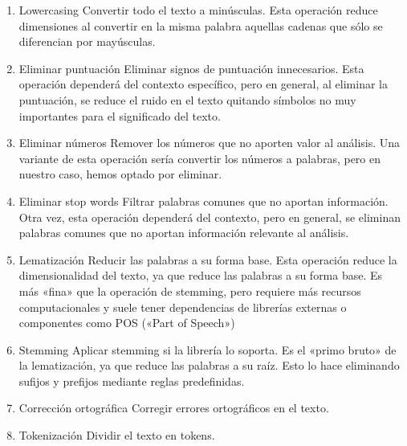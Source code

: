 \documentclass[a4paper,twocolumn]{article}
\begin{document}
    \begin{enumerate}

        \item {Lowercasing} Convertir todo el texto a minúsculas.
        Esta operación reduce dimensiones al convertir en la misma palabra aquellas cadenas que sólo se diferencian por mayúsculas.

        \item {Eliminar puntuación} Eliminar signos de puntuación innecesarios.
        Esta operación dependerá del contexto específico, pero en general, al eliminar la puntuación, se reduce el ruido en el texto quitando
        símbolos no muy importantes para el significado del texto.

        \item {Eliminar números} Remover los números que no aporten valor al análisis.
        Una variante de esta operación sería convertir los números a palabras, pero en nuestro caso, hemos optado por eliminar.

        \item {Eliminar stop words} Filtrar palabras comunes que no aportan información.
        Otra vez, esta operación dependerá del contexto, pero en general, se eliminan palabras comunes que no aportan información relevante al análisis.

        \item {Lematización} Reducir las palabras a su forma base.
        Esta operación reduce la dimensionalidad del texto, ya que reduce las palabras a su forma base.
        Es más «fina» que la operación de stemming, pero requiere más recursos computacionales y suele tener dependencias de librerías externas o componentes como POS («Part of Speech»)\cite{ibm_pos}

        \item {Stemming} Aplicar stemming si la librería lo soporta.
        Es el «primo bruto» de la lematización, ya que reduce las palabras a su raíz.
        Esto lo hace eliminando sufijos y prefijos mediante reglas predefinidas\cite{ibm_pos}.

        \item {Corrección ortográfica} Corregir errores ortográficos en el texto.

        \item {Tokenización} Dividir el texto en tokens.

    \end{enumerate}

    \newpage
\end{document}
